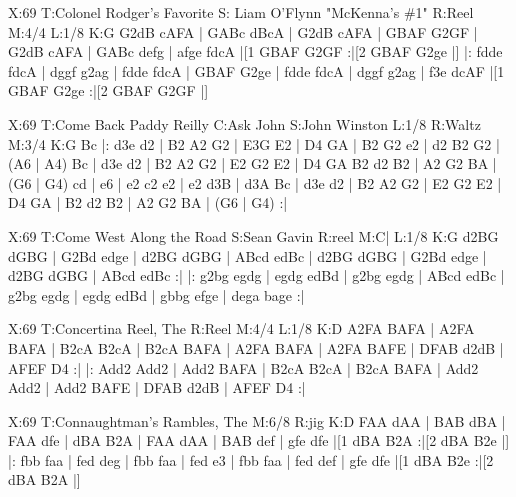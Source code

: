 \documentclass[letterpaper]{article}
\begin{document}
\begin{abc}[name]
X:69
T:Colonel Rodger's Favorite
S: Liam O'Flynn "McKenna's \#1"
R:Reel
M:4/4
L:1/8
K:G
G2dB cAFA | GABc dBcA | G2dB cAFA | GBAF G2GF |
G2dB cAFA | GABc defg | afge fdcA |[1 GBAF G2GF :|[2 GBAF G2ge |]
|: fdde fdcA | dggf g2ag | fdde fdcA | GBAF G2ge |
fdde fdcA | dggf g2ag | f3e dcAF |[1 GBAF G2ge :|[2 GBAF G2GF |]
\end{abc}

\begin{abc}[name]
X:69
T:Come Back Paddy Reilly
C:Ask John
S:John Winston
L:1/8
R:Waltz
M:3/4
K:G
Bc |: d3e d2 | B2 A2 G2 | E3G E2 | D4 GA |
B2 G2 e2 | d2 B2 G2 | (A6 | A4) Bc |
d3e d2 | B2 A2 G2 | E2 G2 E2 | D4 GA
B2 d2 B2 | A2 G2 BA | (G6 | G4) cd |
e6 | e2 c2 e2 | e2 d3B | d3A Bc |
d3e d2 | B2 A2 G2 | E2 G2 E2 | D4 GA |
B2 d2 B2 | A2 G2 BA | (G6 | G4) :|
\end{abc}

\begin{abc}[name]
X:69
T:Come West Along the Road
S:Sean Gavin
R:reel
M:C|
L:1/8
K:G
d2BG dGBG | G2Bd edge | d2BG dGBG | ABcd edBc |
d2BG dGBG | G2Bd edge | d2BG dGBG | ABcd edBc :| 
|: g2bg egdg | egdg edBd | g2bg egdg | ABcd edBc | 
g2bg egdg | egdg edBd | gbbg efge | dega bage :|
\end{abc}

\begin{abc}[name]
X:69
T:Concertina Reel, The
R:Reel
M:4/4
L:1/8
K:D
A2FA BAFA | A2FA BAFA | B2cA B2cA | B2cA BAFA |
A2FA BAFA | A2FA BAFE | DFAB d2dB | AFEF D4 :|
|: Add2 Add2 | Add2 BAFA | B2cA B2cA | B2cA BAFA |
Add2 Add2 | Add2 BAFE | DFAB d2dB | AFEF D4 :|
\end{abc}

\begin{abc}[name]
X:69
T:Connaughtman's Rambles, The
M:6/8
R:jig
K:D
FAA dAA | BAB dBA | FAA dfe | dBA B2A |
FAA dAA | BAB def | gfe dfe |[1 dBA B2A :|[2 dBA B2e |]
|: fbb faa | fed deg | fbb faa | fed e3 |
fbb faa | fed def | gfe dfe |[1 dBA B2e :|[2 dBA B2A |]
\end{abc}
\end{document}
